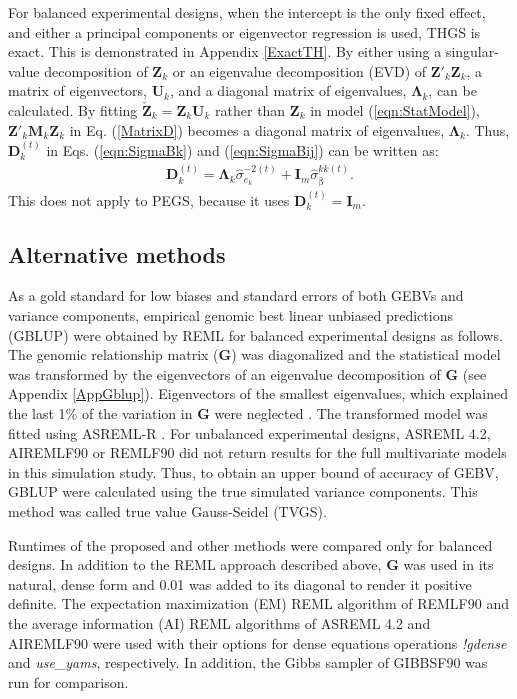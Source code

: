 \documentclass{bmcart}
\begin{document}
For balanced experimental designs, when the intercept is the only fixed effect, and either a principal components \cite{StatLearn} or eigenvector regression \cite{RKHS2010, svd2018, Xavier2021} is used, THGS is exact. This is demonstrated in Appendix \ref{ExactTH}. By either using a singular-value decomposition of $\mathbf{Z}_k$ or an eigenvalue decomposition (EVD) of $\mathbf{Z}'_k\mathbf{Z}_k$, a matrix of eigenvectors, $\mathbf{U}_k$, and a diagonal matrix of eigenvalues, $\mathbf{\Lambda}_k$, can be calculated. By fitting $\check{\mathbf{Z}}_k = \mathbf{Z}_k\mathbf{U}_k$  rather than $\mathbf{Z}_k$ in model (\ref{eqn:StatModel}), $\mathbf{Z}'_k\mathbf{M}_k\mathbf{Z}_k$ in Eq. (\ref{MatrixD})
becomes a diagonal matrix of eigenvalues, $\mathbf{\Lambda}_k$. Thus, $\mathbf{D}^{(t)}_k$ in Eqs. (\ref{eqn:SigmaBk}) and (\ref{eqn:SigmaBij}) can be written as:
\begin{align}\label{UNBIASEDTHGS}
 \mathbf{D}^{(t)}_k = \mathbf{\Lambda}_k\hat{\sigma}^{-2(t)}_{e_k}+\mathbf{I}_m\hat{\sigma}^{kk(t)}_{\upbeta}.
\end{align}
This does not apply to PEGS, because it uses $\mathbf{D}^{(t)}_k = \mathbf{I}_m$.


\subsection{Alternative methods}

As a gold standard for low biases and standard errors of both GEBVs and variance components, empirical genomic best linear unbiased predictions (GBLUP) \cite{GBLUP} were obtained by REML \cite{AIREML} for balanced experimental designs as follows. The genomic relationship matrix ($\mathbf{G}$) was diagonalized and the statistical model was transformed by the eigenvectors of an eigenvalue decomposition of $\mathbf{G}$ \cite{TS1990} (see Appendix \ref{AppGblup}). Eigenvectors of the smallest eigenvalues, which explained the last 1\% of the variation in $\mathbf{G}$ were neglected \cite{Pocrnic2016}. The transformed model was fitted using ASREML-R \cite{asreml}. For unbalanced experimental designs, ASREML 4.2, AIREMLF90 or REMLF90 did not return results for the full multivariate models in this simulation study. Thus, to obtain an upper bound of accuracy of GEBV, GBLUP were calculated using the true simulated variance components. This method was called true value Gauss-Seidel (TVGS).

Runtimes of the proposed and other methods were  compared only for balanced designs. In addition to the REML approach described above, $\mathbf{G}$ was used in its natural, dense form and 0.01 was added to its diagonal to render it positive definite. The expectation maximization (EM) REML algorithm of REMLF90 \cite{BLUPF90} and the average information (AI) REML algorithms of ASREML 4.2 \cite{AIREML,asreml} and AIREMLF90 \cite{YAMS} were used with their options for dense equations operations \textit{!gdense}  and \textit{use\_yams}, respectively. In addition, the Gibbs sampler of GIBBSF90 was run for comparison.
\end{document}
